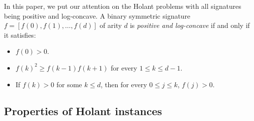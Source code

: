 \documentclass[11pt]{article}
\newtheorem{lemma}[theorem]{Lemma}
\newcommand{\set}[1]{\left\{#1\right\}}
\newcommand{\defeq}{\triangleq} \renewcommand{\d}{\,\-d}
\newcommand{\vecf}{\boldsymbol{f}}
\newcommand{\qtodo}[1]{\todo[color = purple!40, size = \tiny]{\textbf{guoliang:} #1}}
\newcommand{\qgl}[1]{{\color{purple}{#1}}}
\newcommand{\zd}[1]{{\color{green} #1}}
\begin{document}
In this paper, we put our attention on the Holant problems with all signatures being positive and log-concave. A binary symmetric signature $f = [f(0), f(1), \ldots, f(d)]$ of arity $d$ is \emph{positive and log-concave} if and only if it satisfies:
\begin{itemize}
	\item $f(0) > 0$.
    \item $f(k)^2 \ge f(k - 1) f(k + 1)$ for every $1 \le k \le d - 1$.
    \item If $f(k) > 0$ for some $k \le d$, then for every $0 \le j \le k$, $f(j) > 0$.
\end{itemize}

\fi

\subsection{Properties of Holant instances}
\qgl{check this sec}

\end{document}
